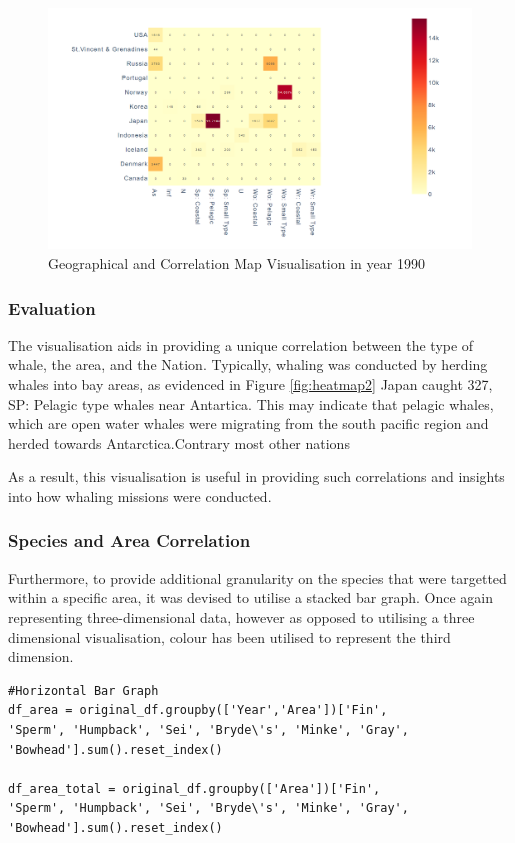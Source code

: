\documentclass[12pt,a4paper]{article}
\begin{document}
\begin{figure}[H]
    \centering
    \includegraphics[width = 15cm]{heatmapALL.png}
    \caption{Geographical and Correlation Map Visualisation in year 1990}
    \label{fig:heatmapALL}
\end{figure}

\subsubsection{Evaluation}
The visualisation aids in providing a unique correlation between the type of whale, the area, and the Nation. Typically, whaling was conducted by herding whales into bay areas, as evidenced in Figure \ref{fig:heatmap2} Japan caught 327, SP: Pelagic type whales near Antartica. This may indicate that pelagic whales, which are open water whales were migrating from the south pacific region and herded towards Antarctica.Contrary most other nations 

As a result, this visualisation is useful in providing such correlations and insights into how whaling missions were conducted. 

\newpage
\subsubsection{Species and Area Correlation}
Furthermore, to provide additional granularity on the species that were targetted within a specific area, it was devised to utilise a stacked bar graph. Once again representing three-dimensional data, however as opposed to utilising a three dimensional visualisation, colour has been utilised to represent the third dimension. 

\begin{verbatim}
#Horizontal Bar Graph
df_area = original_df.groupby(['Year','Area'])['Fin', 
'Sperm', 'Humpback', 'Sei', 'Bryde\'s', 'Minke', 'Gray', 'Bowhead'].sum().reset_index()

df_area_total = original_df.groupby(['Area'])['Fin', 
'Sperm', 'Humpback', 'Sei', 'Bryde\'s', 'Minke', 'Gray', 'Bowhead'].sum().reset_index()
\end{verbatim}
\end{document}
